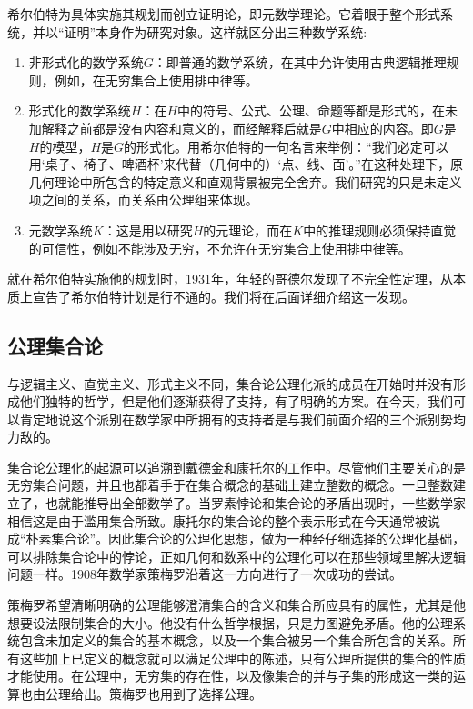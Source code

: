 \documentclass{article}
\begin{document}
希尔伯特为具体实施其规划而创立证明论，即元数学理论。它着眼于整个形式系统，并以“证明”本身作为研究对象。这样就区分出三种数学系统:
\begin{enumerate}
\item 非形式化的数学系统$G$：即普通的数学系统，在其中允许使用古典逻辑推理规则，例如，在无穷集合上使用排中律等。
\item 形式化的数学系统$H$：在$H$中的符号、公式、公理、命题等都是形式的，在未加解释之前都是没有内容和意义的，而经解释后就是$G$中相应的内容。即$G$是$H$的模型，$H$是$G$的形式化。用希尔伯特的一句名言来举例：“我们必定可以用‘桌子、椅子、啤酒杯’来代替（几何中的）‘点、线、面’。”在这种处理下，原几何理论中所包含的特定意义和直观背景被完全舍弃。我们研究的只是未定义项之间的关系，而关系由公理组来体现。
\item 元数学系统$K$：这是用以研究$H$的元理论，而在$K$中的推理规则必须保持直觉的可信性，例如不能涉及无穷，不允许在无穷集合上使用排中律等。
\end{enumerate}

就在希尔伯特实施他的规划时，1931年，年轻的哥德尔发现了不完全性定理，从本质上宣告了希尔伯特计划是行不通的。我们将在后面详细介绍这一发现。

\subsection{公理集合论}

与逻辑主义、直觉主义、形式主义不同，集合论公理化派的成员在开始时并没有形成他们独特的哲学，但是他们逐渐获得了支持，有了明确的方案。在今天，我们可以肯定地说这个派别在数学家中所拥有的支持者是与我们前面介绍的三个派别势均力敌的。

集合论公理化的起源可以追溯到戴德金和康托尔的工作中。尽管他们主要关心的是无穷集合问题，并且也都着手于在集合概念的基础上建立整数的概念。一旦整数建立了，也就能推导出全部数学了。当罗素悖论和集合论的矛盾出现时，一些数学家相信这是由于滥用集合所致。康托尔的集合论的整个表示形式在今天通常被说成“朴素集合论”。因此集合论的公理化思想，做为一种经仔细选择的公理化基础，可以排除集合论中的悖论，正如几何和数系中的公理化可以在那些领域里解决逻辑问题一样。1908年数学家策梅罗沿着这一方向进行了一次成功的尝试。

策梅罗希望清晰明确的公理能够澄清集合的含义和集合所应具有的属性，尤其是他想要设法限制集合的大小。他没有什么哲学根据，只是力图避免矛盾。他的公理系统包含未加定义的集合的基本概念，以及一个集合被另一个集合所包含的关系。所有这些加上已定义的概念就可以满足公理中的陈述，只有公理所提供的集合的性质才能使用。在公理中，无穷集的存在性，以及像集合的并与子集的形成这一类的运算也由公理给出。策梅罗也用到了选择公理。
\end{document}

